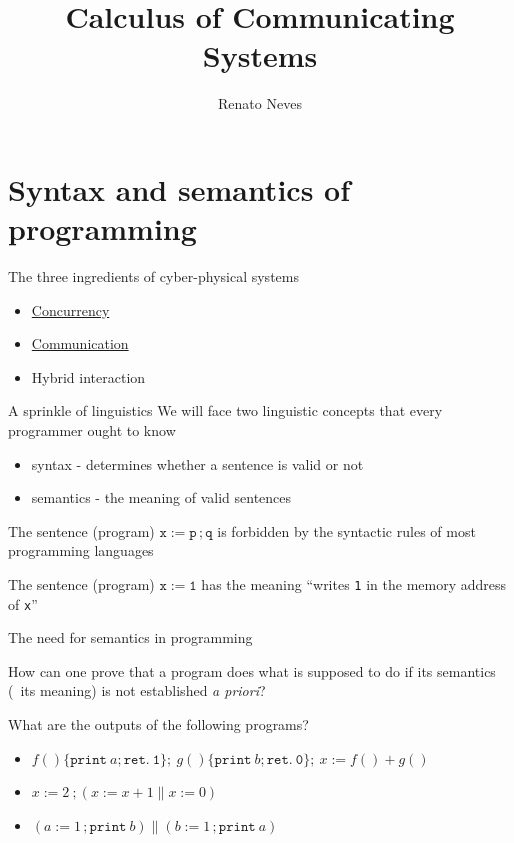 \documentclass{beamer}
\author[Renato Neves]{Renato Neves}
\date{}
\begin{document}
\title{Calculus of Communicating Systems}

\frame[plain]{\titlepage}

\section{Syntax and semantics of programming}

\begin{frame}{The three ingredients of cyber-physical systems}
        \begin{itemize}
                \item \alert{\underline{Concurrency}}
                \item \alert{\underline{Communication}}
                \item Hybrid interaction
        \end{itemize}
\end{frame}


\begin{frame}{A sprinkle of linguistics}
  We will face two linguistic concepts that every programmer
  ought to know
  \begin{itemize}
  \item syntax - determines whether a sentence
    is valid or not
  \item semantics - the meaning of valid sentences
  \end{itemize}

  \vfill
  \begin{example}[syntax]
      The sentence (program) $\mathtt{x := p\, ;q}$ is forbidden by
      the syntactic rules of most programming languages
    \end{example}
  \begin{example}[semantics]
      The sentence (program) $\mathtt{x := 1}$ has the meaning ``writes
      \texttt{1} in the memory address of \texttt{x}''
  \end{example}
\end{frame}

\begin{frame}{The need for semantics in programming}

  How can one prove that a program does what is supposed to do if its
  semantics (\ie\ its meaning) is not established \emph{a priori}?

  \vfill
  \begin{examples}
    What are the outputs of the following programs?
    \begin{itemize}
            \item $f()\{ \mathtt{print}\ a; \mathtt{ret.\ 1} \} ;\
                g()\{ \mathtt{print}\ b; \mathtt{ret.\ 0} \};\
                x:= f() + g()$ 
            \item $x:=2\ ; (x := x + 1 \parallel  x := 0)$ 
            \item $(a:= 1\, ; \mathtt{print}\ b) \parallel 
                    (b:= 1\, ; \mathtt{print}\ a)$ 
    \end{itemize}
  \end{examples}

\end{frame}
\end{document}

